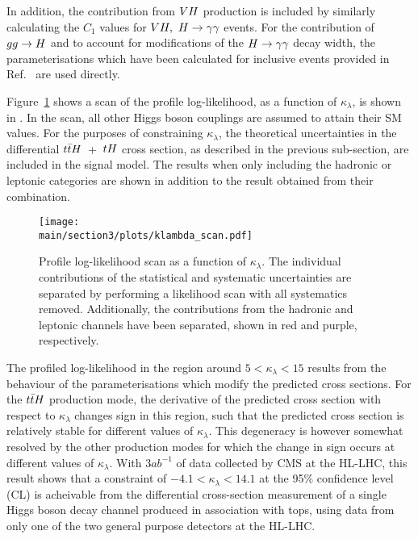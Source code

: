In addition, the contribution from $VH$ production is included by similarly calculating the $C_{1}$ values for $VH,~H\rightarrow\gamma\gamma$ events. For the contribution of $gg\rightarrow H$ and to account for modifications of the $H\rightarrow\gamma\gamma$ decay width, the parameterisations which have been calculated for inclusive events provided in Ref.~\cite{Degrassi:2016wml} are used directly.

Figure~\ref{fig:ttHdiff_CMS_klambda_scan} shows a scan of the profile log-likelihood, as a function of $\kappa_{\lambda}$, is shown in . In the scan, all other Higgs boson couplings are assumed to attain their SM values. For the purposes of constraining $\kappa_{\lambda}$, the theoretical uncertainties in the differential $t\bar{t}H$~+~$tH$ cross section, as described in the previous sub-section, are included in the signal model. The results when only including the hadronic or leptonic categories are shown in addition to the result obtained from their combination. 

\begin{figure}[htb!]
        \centering
        \texttt{[image: \\main/section3/plots/klambda\_scan.pdf]}
        \caption{Profile log-likelihood scan as a function of $\kappa_\lambda$. The individual contributions of the statistical and systematic uncertainties are separated by performing a likelihood scan with all systematics removed. Additionally, the contributions from the hadronic and leptonic channels have been separated, shown in red and purple, respectively.}
        \label{fig:ttHdiff_CMS_klambda_scan}
\end{figure}


The profiled log-likelihood in the region around 
$5<\kappa_\lambda<15$ results from the behaviour of the parameterisations which modify the predicted cross sections. For the $t\bar{t}H$ production mode, the derivative of the predicted cross section with respect to $\kappa_\lambda$ changes sign in this region, such that the predicted cross section is relatively stable for different values of $\kappa_\lambda$. This degeneracy is however somewhat resolved by the  other production modes for which the change in sign occurs at different values of $\kappa_\lambda$. With $3ab^{-1}$ of data collected by CMS at the HL-LHC, this result shows that a constraint of $-4.1 < \kappa_\lambda < 14.1$ at the 95\% confidence level (CL) is acheivable from the differential cross-section measurement of a single Higgs boson decay channel produced in association with tops, using data from only one of the two general purpose detectors at the HL-LHC.  


